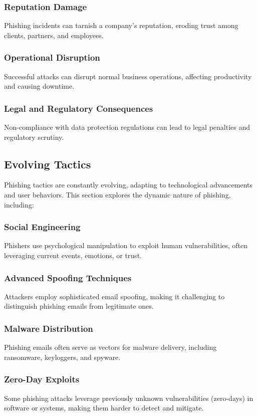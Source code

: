 \documentclass[conference]{IEEEtran}
\begin{document}
\subsubsection{Reputation Damage}
Phishing incidents can tarnish a company's reputation, eroding trust among clients, partners, and employees.

\subsubsection{Operational Disruption}
Successful attacks can disrupt normal business operations, affecting productivity and causing downtime.

\subsubsection{Legal and Regulatory Consequences}
Non-compliance with data protection regulations can lead to legal penalties and regulatory scrutiny.

\subsection{Evolving Tactics}
Phishing tactics are constantly evolving, adapting to technological advancements and user behaviors. This section explores the dynamic nature of phishing, including:

\subsubsection{Social Engineering}
Phishers use psychological manipulation to exploit human vulnerabilities, often leveraging current events, emotions, or trust.

\subsubsection{Advanced Spoofing Techniques}
Attackers employ sophisticated email spoofing, making it challenging to distinguish phishing emails from legitimate ones.

\subsubsection{Malware Distribution}
Phishing emails often serve as vectors for malware delivery, including ransomware, keyloggers, and spyware.

\subsubsection{Zero-Day Exploits}
Some phishing attacks leverage previously unknown vulnerabilities (zero-days) in software or systems, making them harder to detect and mitigate.
\end{document}
